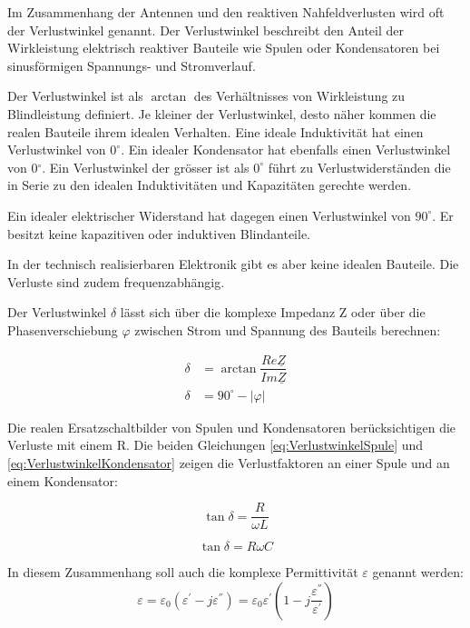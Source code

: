 Im Zusammenhang der Antennen und den reaktiven Nahfeldverlusten wird oft der Verlustwinkel genannt.  Der Verlustwinkel beschreibt den Anteil der Wirkleistung elektrisch reaktiver Bauteile wie Spulen oder Kondensatoren bei sinusförmigen Spannungs- und Stromverlauf. 

Der Verlustwinkel ist als $\arctan$ des Verhältnisses von Wirkleistung zu Blindleistung definiert. 
Je kleiner der Verlustwinkel, desto näher kommen die realen Bauteile ihrem idealen Verhalten. Eine ideale Induktivität hat einen Verlustwinkel von $0^\circ$. Ein idealer Kondensator hat ebenfalls einen Verlustwinkel von 0$^\circ$. Ein Verlustwinkel der grösser ist als $0^\circ$ führt zu Verlustwiderständen die in Serie zu den idealen Induktivitäten und Kapazitäten gerechte werden.

Ein idealer elektrischer Widerstand hat dagegen einen Verlustwinkel von $90^\circ$. Er besitzt keine kapazitiven oder induktiven Blindanteile.

In der technisch realisierbaren Elektronik gibt es aber keine idealen Bauteile. Die Verluste sind zudem frequenzabhängig.

Der Verlustwinkel  $\delta$  lässt sich über die komplexe Impedanz Z oder über die Phasenverschiebung  $\varphi$  zwischen Strom und Spannung des Bauteils berechnen: 

\label{eq:Verlustwinkel}
\begin{align}
\delta &= \arctan \dfrac{Re\underline{Z}}{Im\underline{Z}} \\
\delta &= 90^\circ - |\varphi|
\end{align}

Die realen Ersatzschaltbilder von Spulen und Kondensatoren berücksichtigen die Verluste mit einem R.
Die beiden Gleichungen \ref{eq:VerlustwinkelSpule} und \ref{eq:VerlustwinkelKondensator} zeigen die Verlustfaktoren an einer Spule und an einem Kondensator:

\begin{equation}\label{eq:VerlustwinkelSpule}
\tan \delta = \dfrac{R}{\omega L}
\end{equation}

\begin{equation} \label{eq:VerlustwinkelKondensator}
\tan \delta = R \omega C
\end{equation}

In diesem Zusammenhang soll auch die komplexe Permittivität $\varepsilon$ genannt werden:
\begin{equation} \label{eq:komplexePermitivität}
\varepsilon=\varepsilon_0(\varepsilon^{'}-j\varepsilon^{''})=\varepsilon_0\varepsilon^{'}(1-j\dfrac{\varepsilon^{''}}{\varepsilon^{'}})
\end{equation}

